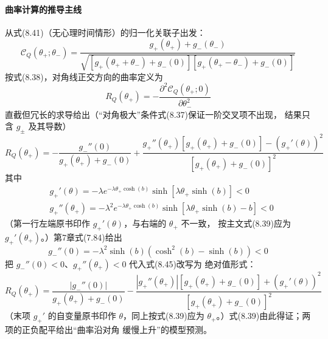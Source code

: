 \paragraph{曲率计算的推导主线}
从式(8.41)（无心理时间情形）的归一化关联子出发：
\begin{equation*}
\mathcal{C}_{Q}(\theta_{+};\theta_{-})=
\frac{g_{+}(\theta_{+})+g_{-}(\theta_{-})}
{\sqrt{\left[g_{+}(\theta_{+}+\theta_{-})+g_{-}(0)\right]
\left[g_{+}(\theta_{+}-\theta_{-})+g_{-}(0)\right]}}
\end{equation*}
按式(8.38)，对角线正交方向的曲率定义为
\begin{equation*}
R_{Q}(\theta_{+})=-\frac{\partial^{2}\mathcal{C}_{Q}(\theta_{+};0)}
{\partial\theta_{-}^{2}}
\end{equation*}
直截但冗长的求导给出（“对角极大”条件式(8.37)保证一阶交叉项不出现，
结果只含 $g_{\pm}$ 及其导数）
\begin{equation*}
R_{Q}(\theta_{+})=-\frac{g_{-}''(0)}{g_{+}(\theta_{+})+g_{-}(0)}
+\frac{g_{+}''(\theta_{+})\left[g_{+}(\theta_{+})+g_{-}(0)\right]
-\left(g_{+}'(\theta)\right)^{2}}
{\left[g_{+}(\theta_{+})+g_{-}(0)\right]^{2}}
\tag{8.45}
\end{equation*}
其中
\begin{align*}
&g_{+}'(\theta)=-\lambda e^{-\lambda\theta_{+}\cosh(b)}
\sinh\left[\lambda\theta_{+}\sinh(b)\right]<0\\
&g_{+}''(\theta_{+})=-\lambda^{2}e^{-\lambda\theta_{+}\cosh(b)}
\sinh\left[\lambda\theta_{+}\sinh(b)-b\right]<0
\end{align*}
（第一行左端原书印作 $g_{+}'(\theta)$，与右端的 $\theta_{+}$ 不一致，
按主文式(8.39)应为 $g_{+}'(\theta_{+})$。）第7章式(7.84)给出
\begin{equation*}
g_{-}''(0)=-\lambda^{2}\sinh(b)\left(\cosh^{2}(b)-\sinh(b)\right)<0
\tag{8.46}
\end{equation*}
把 $g_{-}''(0)<0$、$g_{+}''(\theta_{+})<0$ 代入式(8.45)改写为
绝对值形式：
\begin{equation*}
R_{Q}(\theta_{+})=\frac{|g_{-}''(0)|}{g_{+}(\theta_{+})+g_{-}(0)}
-\frac{|g_{+}''(\theta_{+})|\left[g_{+}(\theta_{+})+g_{-}(0)\right]
+\left(g_{+}'(\theta)\right)^{2}}
{\left[g_{+}(\theta_{+})+g_{-}(0)\right]^{2}}
\tag{8.47}
\end{equation*}
（末项 $g_{+}'$ 的自变量原书印作 $\theta$，同上按式(8.39)应为
$\theta_{+}$。）式(8.39)由此得证；两项的正负配平给出“曲率沿对角
缓慢上升”的模型预测。


